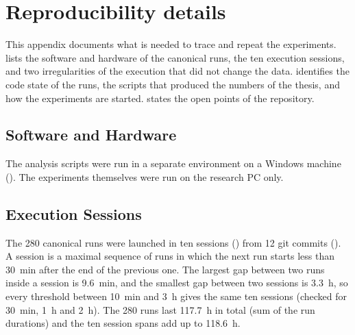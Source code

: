 \chapter{Reproducibility details}
\label{app:reproducibility}

This appendix documents what is needed to trace and repeat the experiments.
 lists the software and hardware of the canonical runs,  the ten execution sessions, and  two irregularities of the execution that did not change the data.
 identifies the code state of the runs,  the scripts that produced the numbers of the thesis, and  how the experiments are started.
 states the open points of the repository.

\section{Software and Hardware}\label{sec:app-repro-env}


The analysis scripts were run in a separate environment on a Windows machine ().
The experiments themselves were run on the research PC only.

\section{Execution Sessions}\label{sec:app-repro-sessions}

The \num{280} canonical runs were launched in ten sessions () from \num{12} git commits ().
A session is a maximal sequence of runs in which the next run starts less than \SI{30}{\minute} after the end of the previous one.
The largest gap between two runs inside a session is \SI{9.6}{\minute}, and the smallest gap between two sessions is \SI{3.3}{\hour}, so every threshold between \SI{10}{\minute} and \SI{3}{\hour} gives the same ten sessions (checked for \SI{30}{\minute}, \SI{1}{\hour} and \SI{2}{\hour}).
The \num{280} runs last \SI{117.7}{\hour} in total (sum of the run durations) and the ten session spans add up to \SI{118.6}{\hour}.


